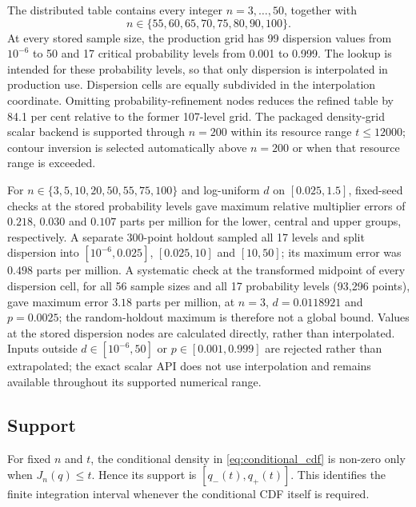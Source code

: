 \documentclass[11pt]{article}
\theoremstyle{remark}
\begin{document}
The distributed table contains every integer $n=3,\ldots,50$, together with
\[
 n\in\{55,60,65,70,75,80,90,100\}.
\]
At every stored sample size, the production grid has 99 dispersion values from $10^{-6}$ to 50 and 17 critical probability levels from 0.001 to 0.999. The lookup is intended for these probability levels, so that only dispersion is interpolated in production use. Dispersion cells are equally subdivided in the interpolation coordinate. Omitting probability-refinement nodes reduces the refined table by 84.1 per cent relative to the former 107-level grid. The packaged density-grid scalar backend is supported through $n=200$ within its resource range $t\le12000$; contour inversion is selected automatically above $n=200$ or when that resource range is exceeded.

For $n\in\{3,5,10,20,50,55,75,100\}$ and log-uniform $d$ on $[0.025,1.5]$, fixed-seed checks at the stored probability levels gave maximum relative multiplier errors of $0.218$, $0.030$ and $0.107$ parts per million for the lower, central and upper groups, respectively. A separate 300-point holdout sampled all 17 levels and split dispersion into $[10^{-6},0.025]$, $[0.025,10]$ and $[10,50]$; its maximum error was $0.498$ parts per million. A systematic check at the transformed midpoint of every dispersion cell, for all 56 sample sizes and all 17 probability levels (93,296 points), gave maximum error $3.18$ parts per million, at $n=3$, $d=0.0118921$ and $p=0.0025$; the random-holdout maximum is therefore not a global bound. Values at the stored dispersion nodes are calculated directly, rather than interpolated. Inputs outside $d\in[10^{-6},50]$ or $p\in[0.001,0.999]$ are rejected rather than extrapolated; the exact scalar API does not use interpolation and remains available throughout its supported numerical range.

\subsection{Support}

For fixed $n$ and $t$, the conditional density in \eqref{eq:conditional_cdf} is non-zero only when $J_n(q)\le t$. Hence its support is $[q_-(t),q_+(t)]$. This identifies the finite integration interval whenever the conditional CDF itself is required.
\end{document}
